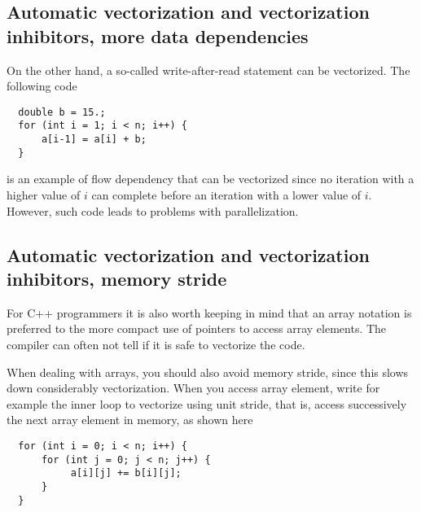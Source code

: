 \documentclass[%
oneside,                 %
final,                   %
10pt]{article}
\begin{document}
\subsection*{Automatic vectorization and vectorization inhibitors, more data dependencies}

On the other hand,  a so-called 
write-after-read statement can be vectorized. The following code
\begin{verbatim}
  double b = 15.;
  for (int i = 1; i < n; i++) {
      a[i-1] = a[i] + b;
  }
\end{verbatim}
is an example of flow dependency that can be vectorized since no iteration with a higher value of $i$
can complete before an iteration with a lower value of $i$. However, such code leads to problems with parallelization.


\subsection*{Automatic vectorization and vectorization inhibitors, memory stride}


For C++ programmers  it is also worth keeping in mind that an array notation is preferred to the more compact use of pointers to access array elements. The compiler can often not tell if it is safe to vectorize the code. 

When dealing with arrays, you should also avoid memory stride, since this slows down considerably vectorization. When you access array element, write for example the inner loop to vectorize using unit stride, that is, access successively the next array element in memory, as shown here
\begin{verbatim}
  for (int i = 0; i < n; i++) {
      for (int j = 0; j < n; j++) {
           a[i][j] += b[i][j];
      }  
  }
\end{verbatim}


\end{document}
